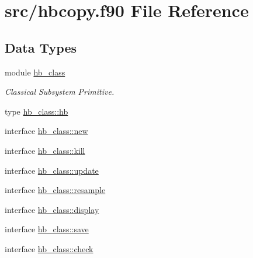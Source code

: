 \hypertarget{hbcopy_8f90}{\section{src/hbcopy.f90 File Reference}
\label{hbcopy_8f90}
}
\subsection*{Data Types}
\begin{DoxyCompactItemize}
\item 
module \hyperlink{classhb__class}{hb\+\_\+class}
\begin{DoxyCompactList}\small\item\em Classical Subsystem Primitive. \end{DoxyCompactList}\item 
type \hyperlink{structhb__class_1_1hb}{hb\+\_\+class\+::hb}
\item 
interface \hyperlink{interfacehb__class_1_1new}{hb\+\_\+class\+::new}
\item 
interface \hyperlink{interfacehb__class_1_1kill}{hb\+\_\+class\+::kill}
\item 
interface \hyperlink{interfacehb__class_1_1update}{hb\+\_\+class\+::update}
\item 
interface \hyperlink{interfacehb__class_1_1resample}{hb\+\_\+class\+::resample}
\item 
interface \hyperlink{interfacehb__class_1_1display}{hb\+\_\+class\+::display}
\item 
interface \hyperlink{interfacehb__class_1_1save}{hb\+\_\+class\+::save}
\item 
interface \hyperlink{interfacehb__class_1_1check}{hb\+\_\+class\+::check}
\end{DoxyCompactItemize}
